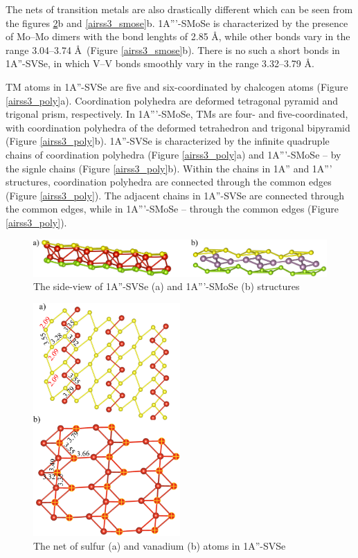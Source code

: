\documentclass[a4paperm]{article}
\begin{document}
The nets of transition metals are also drastically different which can be seen from the figures \ref{airss3_svse}b and \ref{airss3_smose}b.
1A'''-SMoSe is characterized by the presence of Mo--Mo dimers with the bond lenghts of 2.85 \AA, while other bonds vary in the range 3.04--3.74 \AA\ (Figure \ref{airss3_smose}b).
There is no such a short bonds in 1A''-SVSe, in which V--V bonds smoothly vary in the range 3.32--3.79 \AA.

TM atoms in 1A''-SVSe are five and six-coordinated by chalcogen atoms (Figure \ref{airss3_poly}a).
Coordination polyhedra are  deformed tetragonal pyramid and trigonal prism, respectively.
In 1A'''-SMoSe, TMs are four- and five-coordinated, with coordination polyhedra of the deformed tetrahedron and trigonal bipyramid (Figure \ref{airss3_poly}b).
1A''-SVSe is characterized by the infinite quadruple chains of coordination polyhedra (Figure \ref{airss3_poly}a) and 1A'''-SMoSe -- by the signle chains (Figure \ref{airss3_poly}b).
Within the chains in 1A'' and 1A''' structures, coordination polyhedra are connected through the common edges (Figure \ref{airss3_poly}).
The adjacent chains in 1A''-SVSe are connected through the common edges, while in 1A'''-SMoSe -- through the common edges (Figure \ref{airss3_poly}).

\begin{figure}[H]
	\includegraphics[width=\textwidth]{airss3_side.png}
	\caption{The side-view of 1A''-SVSe (a) and 1A'''-SMoSe (b) structures}
	\label{airss3_side}
\end{figure}

\begin{figure}[H]
	\includegraphics[width=0.5\textwidth]{airss3_svse.png}
	\caption{The net of sulfur (a) and vanadium (b) atoms in 1A''-SVSe}
	\label{airss3_svse}
\end{figure}
\end{document}
